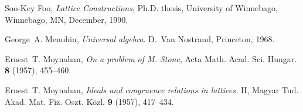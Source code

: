 \documentclass{amsart}
\begin{document}
\begin{thebibliography}{9}

Soo-Key Foo, 
\emph{Lattice Constructions}, 
Ph.D. thesis, 
University of Winnebago, Winnebago, MN, December, 1990.

George~A. Menuhin, 
\emph{Universal algebra}.
D.~Van Nostrand, Princeton, 1968.

Ernest~T. Moynahan, 
\emph{On a problem of M. Stone},
Acta Math. Acad. Sci. Hungar. \textbf{8} (1957), 
455--460.

Ernest~T. Moynahan, 
\emph{Ideals and congruence relations in lattices.} II,
Magyar Tud. Akad. Mat. Fiz. Oszt. K\"{o}zl. \textbf{9} 
(1957), 417--434.

\end{thebibliography}
\end{document}
